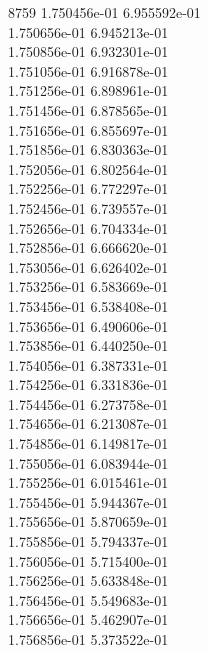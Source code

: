 8759	1.750456e-01	6.955592e-01	\\ 	1.750656e-01	6.945213e-01	\\ 	1.750856e-01	6.932301e-01	\\ 	1.751056e-01	6.916878e-01	\\ 	1.751256e-01	6.898961e-01	\\ 	1.751456e-01	6.878565e-01	\\ 	1.751656e-01	6.855697e-01	\\ 	1.751856e-01	6.830363e-01	\\ 	1.752056e-01	6.802564e-01	\\ 	1.752256e-01	6.772297e-01	\\ 	1.752456e-01	6.739557e-01	\\ 	1.752656e-01	6.704334e-01	\\ 	1.752856e-01	6.666620e-01	\\ 	1.753056e-01	6.626402e-01	\\ 	1.753256e-01	6.583669e-01	\\ 	1.753456e-01	6.538408e-01	\\ 	1.753656e-01	6.490606e-01	\\ 	1.753856e-01	6.440250e-01	\\ 	1.754056e-01	6.387331e-01	\\ 	1.754256e-01	6.331836e-01	\\ 	1.754456e-01	6.273758e-01	\\ 	1.754656e-01	6.213087e-01	\\ 	1.754856e-01	6.149817e-01	\\ 	1.755056e-01	6.083944e-01	\\ 	1.755256e-01	6.015461e-01	\\ 	1.755456e-01	5.944367e-01	\\ 	1.755656e-01	5.870659e-01	\\ 	1.755856e-01	5.794337e-01	\\ 	1.756056e-01	5.715400e-01	\\ 	1.756256e-01	5.633848e-01	\\ 	1.756456e-01	5.549683e-01	\\ 	1.756656e-01	5.462907e-01	\\ 	1.756856e-01	5.373522e-01	\\ \hline
